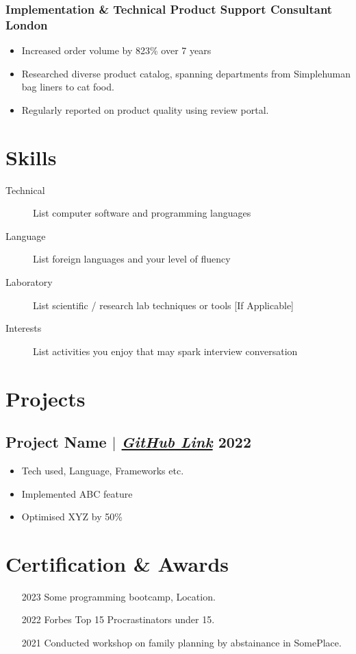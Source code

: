 \documentclass[10pt]{article}
\begin{document}
\subsubsection{Implementation \& Technical Product Support Consultant \small\hfill London}
\begin{itemize}
    \item Increased order volume by 823\% over 7 years 
    \item Researched diverse product catalog, spanning departments from Simplehuman bag liners to cat food. 
    \item Regularly reported on product quality using review portal.
\end{itemize}


\section{Skills}
\begin{description}
    \item[Technical] List computer software and programming languages 
    \item[Language] List foreign languages and your level of fluency
    \item[Laboratory] List scientific / research lab techniques or tools [If Applicable]
    \item[Interests] List activities you enjoy that may spark interview conversation
\end{description}

\section{Projects}
\subsection{Project Name {\normalfont $|$ \href{http://github.com}{\textit{GitHub Link}}} \hfill 2022}
\begin{itemize}
    \item Tech used, Language, Frameworks etc.
    \item Implemented ABC feature
    \item Optimised XYZ by 50\%
\end{itemize}

\section{Certification \& Awards}
\begin{enumerate}[itemsep=0pt]
  \item [2023] Some programming bootcamp, Location.
  \item [2022] Forbes Top 15 Procrastinators under 15.
  \item [2021] Conducted workshop on family planning by abstainance in SomePlace.
\end{enumerate}
\end{document}
